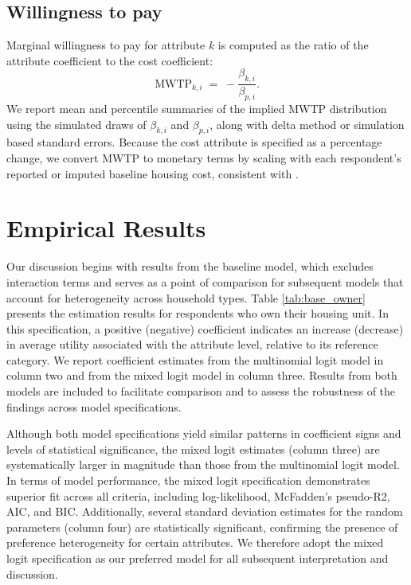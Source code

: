 \documentclass[3p,11pt ]{elsarticle}
\begin{document}
\subsection{Willingness to pay}
Marginal willingness to pay for attribute $k$ is computed as the ratio of the attribute coefficient to the cost coefficient:
\begin{equation}
\text{MWTP}_{k,i} \;=\; - \frac{\beta_{k,i}}{\beta_{p,i}}.
\end{equation}
We report mean and percentile summaries of the implied MWTP distribution using the simulated draws of $\beta_{k,i}$ and $\beta_{p,i}$, along with delta method or simulation based standard errors. Because the cost attribute is specified as a percentage change, we convert MWTP to monetary terms by scaling with each respondent's reported or imputed baseline housing cost, consistent with \citet{Caplan2021}.




\section{Empirical Results}


Our discussion begins with results from the baseline model, which excludes interaction terms and serves as a point of comparison for subsequent models that account for heterogeneity across household types.
Table \ref{tab:base_owner} presents the estimation results for respondents who own their housing unit.
In this specification, a positive (negative) coefficient indicates an increase (decrease) in average utility associated with the attribute level, relative to its reference category. We report coefficient estimates from the multinomial logit model in column two and from the mixed logit model in column three.
Results from both models are included to facilitate comparison and to assess the robustness of the findings across model specifications.




Although both model specifications yield similar patterns in coefficient signs and levels of statistical significance, the mixed logit estimates (column three) are systematically larger in magnitude than those from the multinomial logit model.
In terms of model performance, the mixed logit specification demonstrates superior fit across all criteria, including log-likelihood, McFadden's pseudo-R2, AIC, and BIC.
Additionally, several standard deviation estimates for the random parameters (column four) are statistically significant, confirming the presence of preference heterogeneity for certain attributes.
We therefore adopt the mixed logit specification as our preferred model for all subsequent interpretation and discussion.
\end{document}
